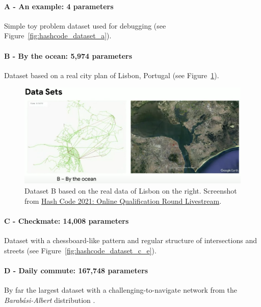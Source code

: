 \paragraph{A - An example: 4 parameters} Simple toy problem dataset used for debugging (see Figure~\ref{fig:hashcode_dataset_a}).

\paragraph{B - By the ocean: 5,974 parameters} Dataset based on a real city plan of Lisbon, Portugal (see Figure~\ref{fig:hashcode_dataset_b}).

\begin{figure}[h]
    \centering
    \includegraphics[width=\linewidth]{img/screenshots/hashcode_datasets_b.png}
    \caption[Visualization of dataset B]{
        Dataset B based on the real data of Lisbon on the right. Screenshot from \href{https://www.youtube.com/watch?v=YPOVd-hQUjA}{Hash Code 2021: Online Qualification Round Livestream}.
    }
    \label{fig:hashcode_dataset_b}
\end{figure}

\paragraph{C - Checkmate: 14,008 parameters} Dataset with a chessboard-like pattern and regular structure of intersections and streets (see Figure~\ref{fig:hashcode_dataset_c_e}).

\paragraph{D - Daily commute: 167,748 parameters} By far the largest dataset with a challenging-to-navigate network from the \textit{Barabási-Albert} distribution \cite{albert2002statistical}.

